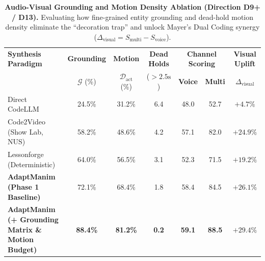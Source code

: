 \begin{table}[t]
\centering
\small
\caption{\textbf{Audio-Visual Grounding and Motion Density Ablation (Direction D9+ / D13).} 
Evaluating how fine-grained entity grounding and dead-hold motion density eliminate the ``decoration trap'' and unlock Mayer's Dual Coding synergy ($\Delta_{\text{visual}} = S_{\text{multi}} - S_{\text{voice}}$).}
\label{tab:grounding_motion_ablation}
\begin{tabular}{lcccccc}
\toprule
\textbf{Synthesis Paradigm} & \textbf{Grounding} & \textbf{Motion} & \textbf{Dead Holds} & \multicolumn{2}{c}{\textbf{Channel Scoring}} & \textbf{Visual Uplift} \\
& $\mathcal{G}$ (\%) & $\mathcal{D}_{\text{act}}$ (\%) & ($> 2.5\text{s}$) & \textbf{Voice} & \textbf{Multi} & $\Delta_{\text{visual}}$ \\
\midrule
Direct CodeLLM & 24.5\% & 31.2\% & 6.4 & 48.0 & 52.7 & $+4.7\%$ \\
Code2Video (Show Lab, NUS) & 58.2\% & 48.6\% & 4.2 & 57.1 & 82.0 & $+24.9\%$ \\
Lessonforge (Deterministic) & 64.0\% & 56.5\% & 3.1 & 52.3 & 71.5 & $+19.2\%$ \\
\midrule
\textbf{AdaptManim (Phase 1 Baseline)} & 72.1\% & 68.4\% & 1.8 & 58.4 & 84.5 & $+26.1\%$ \\
\textbf{AdaptManim (+ Grounding Matrix \& Motion Budget)} & \textbf{88.4\%} & \textbf{81.2\%} & \textbf{0.2} & \textbf{59.1} & \textbf{88.5} & $\mathbf{+29.4\%}$ \\
\bottomrule
\end{tabular}
\end{table}
